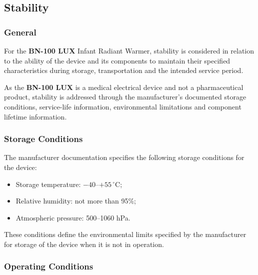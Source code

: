 
\hypertarget{p3-3-6}{}

\subsection{Stability}

\subsubsection{General}

For the \textbf{BN-100 LUX} Infant Radiant Warmer, stability is considered
in relation to the ability of the device and its components to maintain
their specified characteristics during storage, transportation and the
intended service period.

As the \textbf{BN-100 LUX} is a medical electrical device and not a
pharmaceutical product, stability is addressed through the manufacturer's
documented storage conditions, service-life information, environmental
limitations and component lifetime information.

\subsubsection{Storage Conditions}

The manufacturer documentation specifies the following storage conditions
for the device:

\begin{itemize}

    \item Storage temperature: $-40$--$+55\,^\circ$C;

    \item Relative humidity: not more than 95\%;

    \item Atmospheric pressure: 500--1060 hPa.

\end{itemize}

These conditions define the environmental limits specified by the
manufacturer for storage of the device when it is not in operation.

\subsubsection{Operating Conditions}


